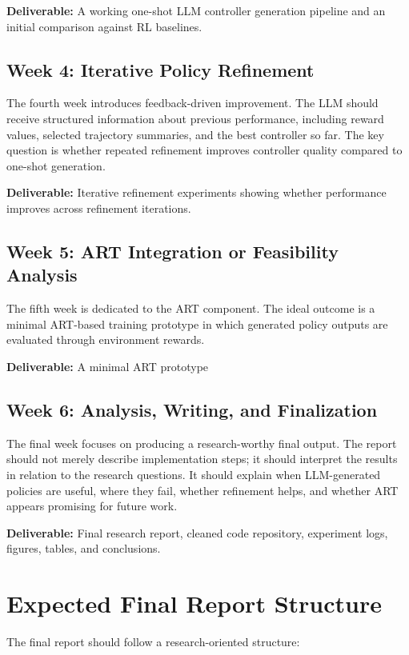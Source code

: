 \documentclass[11pt,a4paper]{article}
\newcommand{\deliverable}[1]{\textbf{Deliverable:} #1}
\begin{document}
\deliverable{A working one-shot LLM controller generation pipeline and an initial comparison against RL baselines.}

\subsection*{Week 4: Iterative Policy Refinement}

The fourth week introduces feedback-driven improvement. The LLM should receive structured information about previous performance, including reward values, selected trajectory summaries, and the best controller so far. The key question is whether repeated refinement improves controller quality compared to one-shot generation.

\deliverable{Iterative refinement experiments showing whether performance improves across refinement iterations.}

\subsection*{Week 5: ART Integration or Feasibility Analysis}

The fifth week is dedicated to the ART component. The ideal outcome is a minimal ART-based training prototype in which generated policy outputs are evaluated through environment rewards.

\deliverable{A minimal ART prototype}

\subsection*{Week 6: Analysis, Writing, and Finalization}

The final week focuses on producing a research-worthy final output. The report should not merely describe implementation steps; it should interpret the results in relation to the research questions. It should explain when LLM-generated policies are useful, where they fail, whether refinement helps, and whether ART appears promising for future work.

\deliverable{Final research report, cleaned code repository, experiment logs, figures, tables, and conclusions.}

\section{Expected Final Report Structure}

The final report should follow a research-oriented structure:
\end{document}

